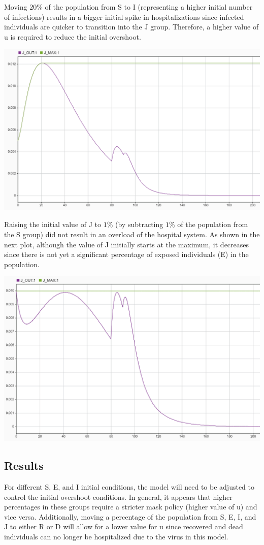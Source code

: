 \documentclass[fleqn]{article}
\begin{document}
\newpage

Moving $20\%$ of the population from S to I (representing a higher initial number of infections) results in a bigger initial spike in hospitalizations since infected individuals are quicker to transition into the J group. Therefore, a higher value of u is required to reduce the initial overshoot.

\begin{center}
    \includegraphics[width=0.7\linewidth]{init_conditions_higher_i} 
\end{center}

Raising the initial value of J to $1\%$ (by subtracting $1\%$ of the population from the S group) did not result in an overload of the hospital system. As shown in the next plot, although the value of J initially starts at the maximum, it decreases since there is not yet a significant percentage of exposed individuals (E) in the population.

\begin{center}
    \includegraphics[width=0.7\linewidth]{init_conditions_high_j} 
\end{center}

\newpage

\subsection*{Results}
For different S, E, and I initial conditions, the model will need to be adjusted to control the initial overshoot conditions. In general, it appears that higher percentages in these groups require a stricter mask policy (higher value of u) and vice versa. Additionally, moving a percentage of the population from S, E, I, and J to either R or D will allow for a lower value for u since recovered and dead individuals can no longer be hospitalized due to the virus in this model.
\end{document}
